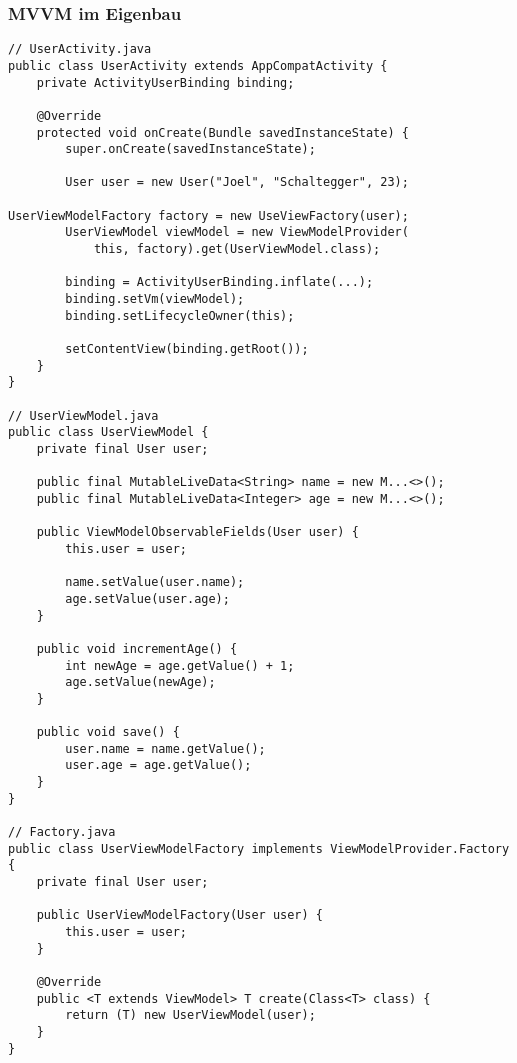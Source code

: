 \subsubsection{MVVM im Eigenbau}
\begin{lstlisting}
// UserActivity.java
public class UserActivity extends AppCompatActivity {
    private ActivityUserBinding binding;

    @Override
    protected void onCreate(Bundle savedInstanceState) {
        super.onCreate(savedInstanceState);

        User user = new User("Joel", "Schaltegger", 23);

UserViewModelFactory factory = new UseViewFactory(user);
        UserViewModel viewModel = new ViewModelProvider(
            this, factory).get(UserViewModel.class);

        binding = ActivityUserBinding.inflate(...);
        binding.setVm(viewModel);
        binding.setLifecycleOwner(this);

        setContentView(binding.getRoot());
    }
}

// UserViewModel.java
public class UserViewModel {
    private final User user;

    public final MutableLiveData<String> name = new M...<>();
    public final MutableLiveData<Integer> age = new M...<>();

    public ViewModelObservableFields(User user) {
        this.user = user;

        name.setValue(user.name);
        age.setValue(user.age);
    }

    public void incrementAge() {
        int newAge = age.getValue() + 1;
        age.setValue(newAge);
    }

    public void save() {
        user.name = name.getValue();
        user.age = age.getValue();
    }
}

// Factory.java
public class UserViewModelFactory implements ViewModelProvider.Factory {
    private final User user;

    public UserViewModelFactory(User user) {
        this.user = user;
    }

    @Override
    public <T extends ViewModel> T create(Class<T> class) {
        return (T) new UserViewModel(user);
    }
}
\end{lstlisting}
